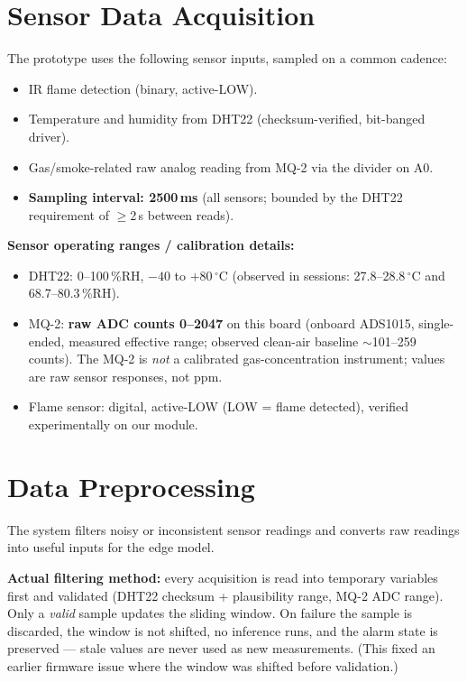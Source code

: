 \documentclass[11pt]{article}
\newcommand{\celsius}{\,$^\circ$C}
\begin{document}
\section{Sensor Data Acquisition}
The prototype uses the following sensor inputs, sampled on a common
cadence:

\begin{itemize}[nosep]
  \item IR flame detection (binary, active-LOW).
  \item Temperature and humidity from DHT22 (checksum-verified,
    bit-banged driver).
  \item Gas/smoke-related raw analog reading from MQ-2 via the
    divider on A0.
  \item \textbf{Sampling interval: 2500\,ms} (all sensors; bounded by
    the DHT22 requirement of $\geq$2\,s between reads).
\end{itemize}

\textbf{Sensor operating ranges / calibration details:}
\begin{itemize}[nosep]
  \item DHT22: 0--100\,\%RH, $-40$ to $+80$\celsius{} (observed in
    sessions: 27.8--28.8\celsius{} and 68.7--80.3\,\%RH).
  \item MQ-2: \textbf{raw ADC counts 0--2047} on this board (onboard
    ADS1015, single-ended, measured effective range; observed clean-air
    baseline $\sim$101--259 counts). The MQ-2 is \emph{not} a
    calibrated gas-concentration instrument; values are raw sensor
    responses, not ppm.
  \item Flame sensor: digital, active-LOW (LOW = flame detected),
    verified experimentally on our module.
\end{itemize}

\section{Data Preprocessing}
The system filters noisy or inconsistent sensor readings and converts
raw readings into useful inputs for the edge model.

\textbf{Actual filtering method:} every acquisition is read into
temporary variables first and validated (DHT22 checksum +
plausibility range, MQ-2 ADC range). Only a \emph{valid} sample updates
the sliding window. On failure the sample is discarded, the window is
not shifted, no inference runs, and the alarm state is preserved ---
stale values are never used as new measurements. (This fixed an earlier
firmware issue where the window was shifted before validation.)
\end{document}
